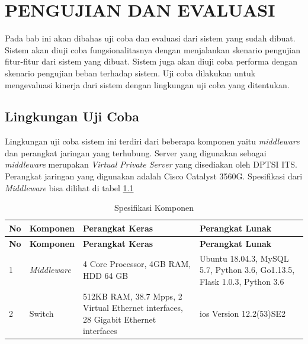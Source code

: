 \chapter{PENGUJIAN DAN EVALUASI}
Pada bab ini akan dibahas uji coba dan evaluasi dari sistem yang sudah dibuat. Sistem akan diuji coba fungsionalitasnya dengan menjalankan skenario pengujian fitur-fitur dari sistem yang dibuat. Sistem juga akan diuji coba performa dengan skenario pengujian beban terhadap sistem. Uji coba dilakukan untuk mengevaluasi kinerja dari sistem dengan lingkungan uji coba yang ditentukan.

\section{Lingkungan Uji Coba}
Lingkungan uji coba sistem ini terdiri dari beberapa komponen yaitu \textit{middleware} dan perangkat jaringan yang terhubung. Server yang digunakan sebagai \textit{middleware} merupakan \textit{Virtual Private Server} yang disediakan oleh DPTSI ITS. Perangkat jaringan yang digunakan adalah Cisco Catalyst 3560G. Spesifikasi dari \textit{Middleware} bisa dilihat di tabel \ref{tabelKomponen} 
   \begin{longtable}{|p{}|p{}|p{}|p{}|}
   	
   	\caption{Spesifikasi Komponen} \label{tabelKomponen} \\
   	\hline
   	\textbf{No} & \textbf{Komponen} & \textbf{Perangkat Keras} & \textbf{Perangkat Lunak} \\ \hline
   	\endfirsthead
   	
   	\hline
   	\textbf{No} & \textbf{Komponen} & \textbf{Perangkat Keras} & \textbf{Perangkat Lunak} \\ \hline
   	\endhead
   	\endfoot
   	\endlastfoot
   	
   	1 & \textit{Middleware} & 4 Core Processor, 4GB RAM, HDD 64 GB & Ubuntu 18.04.3, MySQL 5.7, Python 3.6, Go1.13.5, Flask 1.0.3, Python 3.6 \\ \hline
   	2 & Switch & 512KB RAM, 38.7 Mpps, 2 Virtual Ethernet interfaces, 28 Gigabit Ethernet interfaces & ios Version 12.2(53)SE2 \\ \hline
		
   	
   \end{longtable}

